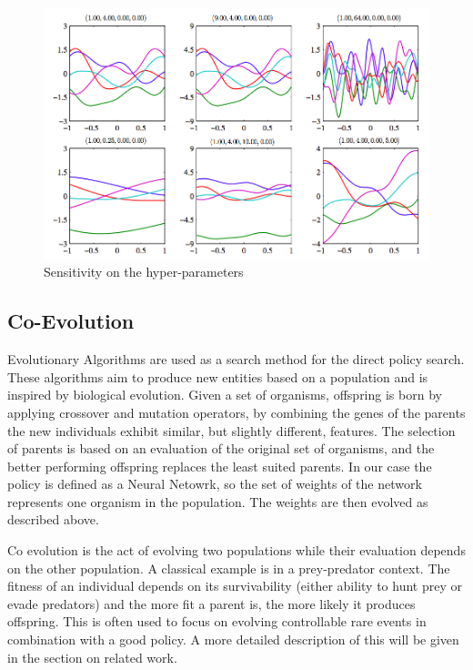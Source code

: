 \begin{figure}[ht]
  \centering
  \includegraphics[scale=0.5]{images/gp.png}
  \caption{Sensitivity on the hyper-parameters \cite{bishop2006pattern}}\label{gp}
\end{figure}

\subsection{Co-Evolution}
Evolutionary Algorithms are used as a search method for the direct policy search. These algorithms aim to produce new entities based on a population and is inspired by biological evolution. Given a set of organisms, offspring is born by applying crossover and mutation operators, by combining the genes of the parents the new individuals exhibit similar, but slightly different, features. The selection of parents is based on an evaluation of the original set of organisms, and the better performing offspring replaces the least suited parents. In our case the policy is defined as a Neural Netowrk, so the set of weights of the network represents one organism in the population. The weights are then evolved as described above.

Co evolution is the act of evolving two populations while their evaluation depends on the other population. A classical example is in a prey-predator context. The fitness of an individual depends on its survivability (either ability to hunt prey or evade predators) and the more fit a parent is, the more likely it produces offspring. This is often used to focus on evolving controllable rare events in combination with a good policy. A more detailed description of this will be given in the section on related work.

